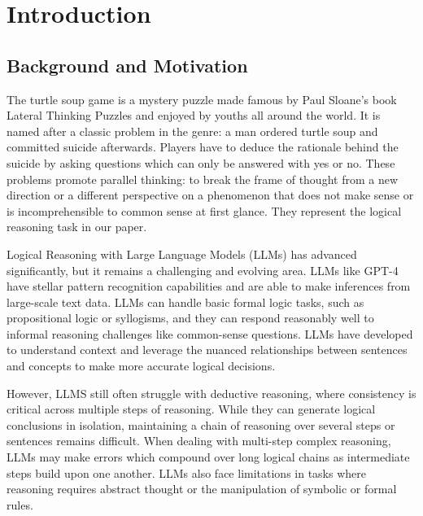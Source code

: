 \section{Introduction}
\subsection{Background and Motivation}
        The turtle soup game is a mystery puzzle made famous by Paul Sloane's book Lateral Thinking Puzzles and enjoyed by youths all around the world. It is named after a classic problem in the genre: a man ordered turtle soup and committed suicide afterwards. Players have to deduce the rationale behind the suicide by asking questions which can only be answered with yes or no. These problems promote parallel thinking: to break the frame of thought from a new direction or a different perspective on a phenomenon that does not make sense or is incomprehensible to common sense at first glance.  They represent the logical reasoning task in our paper.

    Logical Reasoning with Large Language Models (LLMs) has advanced significantly, but it remains a challenging and evolving area. LLMs like GPT-4 have stellar pattern recognition capabilities and are able to make inferences from large-scale text data. LLMs can handle basic formal logic tasks, such as propositional logic or syllogisms, and they can respond reasonably well to informal reasoning challenges like common-sense questions. LLMs have developed to understand context and leverage the nuanced relationships between sentences and concepts to make more accurate logical decisions. 
    
    However, LLMS still often struggle with deductive reasoning, where consistency is critical across multiple steps of reasoning. While they can generate logical conclusions in isolation, maintaining a chain of reasoning over several steps or sentences remains difficult. When dealing with multi-step complex reasoning, LLMs may make errors which compound over long logical chains as intermediate steps build upon one another.  LLMs also face limitations in tasks where reasoning requires abstract thought or the manipulation of symbolic or formal rules.
    
